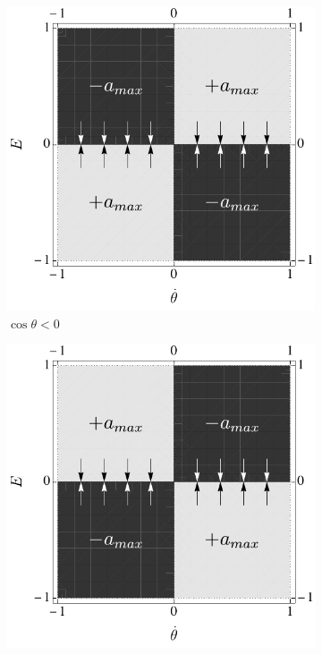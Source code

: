 \begin{figure}
    \vskip 0pt
    \centering
    \begin{subfigure}[t]{0.48\textwidth}
        \centering
        \includegraphics[width=\textwidth]{assets/energy-control1}
        \caption{$\cos\theta < 0$}
    \end{subfigure}
    \hfill
    \begin{subfigure}[t]{0.48\textwidth}
        \centering
        \includegraphics[width=\textwidth]{assets/energy-control2}

\end{subfigure}
\end{figure}
